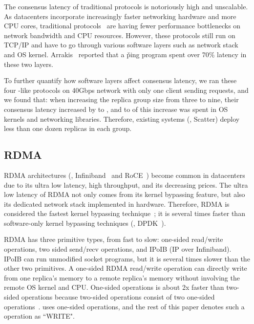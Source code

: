 The consensus latency of traditional \paxos protocols is notoriously high and 
unscalable. As datacenters incorporate increasingly faster networking hardware 
and more CPU cores, traditional 
\paxos 
protocols~\cite{libpaxos,spaxos:srds12,crane:sosp15,rex:eurosys14,zookeeper} are 
having fewer performance bottlenecks on network bandwidth and CPU resources. 
However, these protocols still run on TCP/IP and have to go through various 
software layers such as network stack and OS kernel. 
Arrakis~\cite{arrakis:osdi14} reported that a \v{ping} program spent over 70\% 
latency in these two layers.

To further quantify how software layers affect \paxos consensus latency, 
we ran these four \paxos-like protocols on 40Gbps network with only one client 
sending requests, and we found that: when increasing the replica group size from 
three to nine, their consensus latency increased by \tradlatencyincreaselow to 
\tradlatencyincreasehigh, and \systemcostlow to \systemcosthigh of this increase 
was spent in OS kernels and networking libraries. Therefore, existing systems 
(\eg, Scatter) deploy less than one dozen replicas in each \paxos group.




\subsection{RDMA}\label{sec:rdma}
RDMA architectures (\eg, Infiniband~\cite{infiniband} and RoCE~\cite{roce})
become common in datacenters due to its ultra low latency, high throughput, and 
its decreasing prices. The ultra low latency of RDMA not only comes from its 
kernel bypassing feature, but also its dedicated network stack implemented in 
hardware. Therefore, RDMA is considered the fastest kernel bypassing 
technique~\cite{herd:sigcomm14,pilaf:usenix14,dare:hpdc15}; it is several times 
faster than software-only kernel bypassing techniques (\eg, DPDK~\cite{dpdk}).

RDMA has three primitive types, from fast to slow: one-sided 
read/write operations, two sided send/recv operations, and IPoIB (IP over 
Infiniband). IPoIB can run unmodified socket programs, but it is several times 
slower than the other two primitives. A one-sided RDMA read/write 
operation can directly write from one replica's memory to a remote 
replica's memory without involving the remote OS kernel and CPU. One-sided 
operations is about 2x faster than two-sided operations because two-sided 
operations consist of two one-sided operations~\cite{pilaf:usenix14}. \xxx 
uses one-sided operations, and the rest of this paper denotes such a operation 
as ``WRITE".

